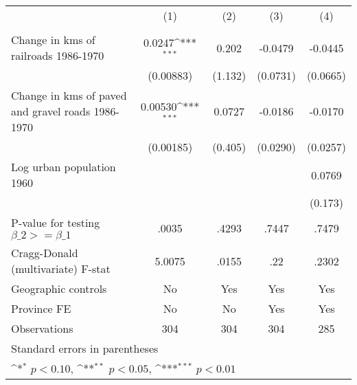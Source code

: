 {
\def\sym#1{\ifmmode^{#1}\else\(^{#1}\)\fi}
\begin{tabular}{l*{4}{c}}
\hline\hline
                &\multicolumn{1}{c}{(1)}&\multicolumn{1}{c}{(2)}&\multicolumn{1}{c}{(3)}&\multicolumn{1}{c}{(4)}\\
                &\multicolumn{1}{c}{}&\multicolumn{1}{c}{}&\multicolumn{1}{c}{}&\multicolumn{1}{c}{}\\
\hline
Change in kms of railroads 1986-1970&   0.0247\sym{***}&    0.202         &  -0.0479         &  -0.0445         \\
                &(0.00883)         &  (1.132)         & (0.0731)         & (0.0665)         \\
[1em]
Change in kms of paved and gravel roads 1986-1970&  0.00530\sym{***}&   0.0727         &  -0.0186         &  -0.0170         \\
                &(0.00185)         &  (0.405)         & (0.0290)         & (0.0257)         \\
[1em]
Log urban population 1960&                  &                  &                  &   0.0769         \\
                &                  &                  &                  &  (0.173)         \\
\hline
P-value for testing $\beta\_{2} >= \beta\_{1}$&    .0035         &    .4293         &    .7447         &    .7479         \\
Cragg-Donald (multivariate) F-stat&   5.0075         &    .0155         &      .22         &    .2302         \\
Geographic controls&       No         &      Yes         &      Yes         &      Yes         \\
Province FE     &       No         &       No         &      Yes         &      Yes         \\
Observations    &      304         &      304         &      304         &      285         \\
\hline\hline
\multicolumn{5}{l}{\footnotesize Standard errors in parentheses}\\
\multicolumn{5}{l}{\footnotesize \sym{*} \(p<0.10\), \sym{**} \(p<0.05\), \sym{***} \(p<0.01\)}\\
\end{tabular}
}
